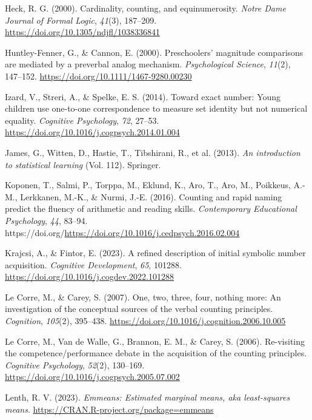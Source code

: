 \documentclass[
  man,floatsintext]{apa7}
\newlength{\cslhangindent}
\newenvironment{CSLReferences}[2] %
 {\begin{list}{}{%
  \setlength{\itemindent}{0pt}
  \setlength{\leftmargin}{0pt}
  \setlength{\parsep}{0pt}
  \ifodd #1
   \setlength{\leftmargin}{\cslhangindent}
   \setlength{\itemindent}{-1\cslhangindent}
  \fi
  \setlength{\itemsep}{#2\baselineskip}}}
 {\end{list}}
\begin{document}
\begin{CSLReferences}{1}{0}
Heck, R. G. (2000). Cardinality, counting, and equinumerosity. \emph{Notre Dame Journal of Formal Logic}, \emph{41}(3), 187--209. \url{https://doi.org/10.1305/ndjfl/1038336841}

Huntley-Fenner, G., \& Cannon, E. (2000). Preschoolers' magnitude comparisons are mediated by a preverbal analog mechanism. \emph{Psychological Science}, \emph{11}(2), 147--152. \url{https://doi.org/10.1111/1467-9280.00230}

Izard, V., Streri, A., \& Spelke, E. S. (2014). Toward exact number: {Young} children use one-to-one correspondence to measure set identity but not numerical equality. \emph{Cognitive Psychology}, \emph{72}, 27--53. \url{https://doi.org/10.1016/j.cogpsych.2014.01.004}

James, G., Witten, D., Hastie, T., Tibshirani, R., et al. (2013). \emph{An introduction to statistical learning} (Vol. 112). Springer.

Koponen, T., Salmi, P., Torppa, M., Eklund, K., Aro, T., Aro, M., Poikkeus, A.-M., Lerkkanen, M.-K., \& Nurmi, J.-E. (2016). Counting and rapid naming predict the fluency of arithmetic and reading skills. \emph{Contemporary Educational Psychology}, \emph{44}, 83--94. https://doi.org/\url{https://doi.org/10.1016/j.cedpsych.2016.02.004}

Krajcsi, A., \& Fintor, E. (2023). A refined description of initial symbolic number acquisition. \emph{Cognitive Development}, \emph{65}, 101288. \url{https://doi.org/10.1016/j.cogdev.2022.101288}

Le Corre, M., \& Carey, S. (2007). One, two, three, four, nothing more: An investigation of the conceptual sources of the verbal counting principles. \emph{Cognition}, \emph{105}(2), 395--438. \url{https://doi.org/10.1016/j.cognition.2006.10.005}

Le Corre, M., Van de Walle, G., Brannon, E. M., \& Carey, S. (2006). Re-visiting the competence/performance debate in the acquisition of the counting principles. \emph{Cognitive Psychology}, \emph{52}(2), 130--169. \url{https://doi.org/10.1016/j.cogpsych.2005.07.002}

Lenth, R. V. (2023). \emph{Emmeans: Estimated marginal means, aka least-squares means}. \url{https://CRAN.R-project.org/package=emmeans}


\end{CSLReferences}
\end{document}
